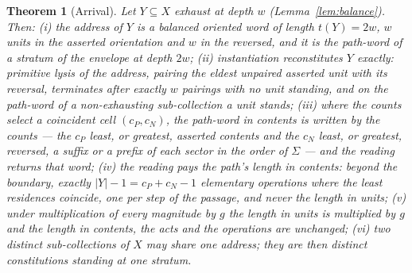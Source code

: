 \documentclass[pdflatex,sn-mathphys-num]{sn-jnl}
\theoremstyle{thmstyleone}%
\newtheorem{theorem}{Theorem}[section]
\theoremstyle{thmstyletwo}%
\theoremstyle{thmstylethree}%
\newtheorem{theorem}{Theorem}[section]
\begin{document}
\begin{theorem}[Arrival]\label{thm:pathword}
Let $Y\subseteq X$ exhaust at depth $w$ (Lemma~\ref{lem:balance}). Then: (i) the address of $Y$ is a balanced oriented word of length $t(Y)=2w$, $w$ units in the asserted orientation and $w$ in the reversed, and it is the path-word of a stratum of the envelope at depth $2w$; (ii) instantiation reconstitutes $Y$ exactly: primitive lysis of the address, pairing the eldest unpaired asserted unit with its reversal, terminates after exactly $w$ pairings with no unit standing, and on the path-word of a non-exhausting sub-collection a unit stands; (iii) where the counts select a coincident cell $(c_P,c_N)$, the path-word in contents is written by the counts --- the $c_P$ least, or greatest, asserted contents and the $c_N$ least, or greatest, reversed, a suffix or a prefix of each sector in the order of $\Sigma$ --- and the reading returns that word; (iv) the reading pays the path's length in contents: beyond the boundary, exactly $|Y|-1=c_P+c_N-1$ elementary operations where the least residences coincide, one per step of the passage, and never the length in units; (v) under multiplication of every magnitude by $g$ the length in units is multiplied by $g$ and the length in contents, the acts and the operations are unchanged; (vi) two distinct sub-collections of $X$ may share one address; they are then distinct constitutions standing at one stratum.
\end{theorem}
\end{document}
